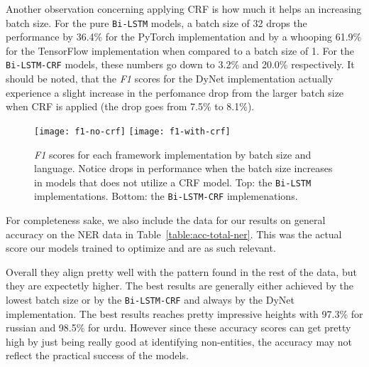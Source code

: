 Another observation concerning applying CRF is how much it helps an increasing
batch size. For the pure \texttt{Bi-LSTM} models, a batch size of 32 drops the
performance by 36.4\% for the PyTorch implementation and by a whooping 61.9\%
for the TensorFlow implementation when compared to a batch size of 1. For the
\texttt{Bi-LSTM-CRF} models, these numbers go down to 3.2\% and 20.0\%
respectively. It should be noted, that the \textit{F1} scores for the DyNet
implementation actually experience a slight increase in the perfomance drop from
the larger batch size when CRF is applied (the drop goes from 7.5\% to 8.1\%).

\begin{figure}[h!]
    \texttt{[image: f1-no-crf]}
    \texttt{[image: f1-with-crf]}
    \caption{\textit{F1} scores for each framework implementation by batch size
        and language. Notice drops in performance when the batch size increases
        in models that does not utilize a CRF model. Top: the \texttt{Bi-LSTM}
        implementations. Bottom: the \texttt{Bi-LSTM-CRF} implemenations.
    }\label{chart:f1-by-batch-and-lang}
\end{figure}

For completeness sake, we also include the data for our results on general
accuracy on the NER data in Table~\ref{table:acc-total-ner}. This was the actual
score our models trained to optimize and are as such relevant. 

Overall they align pretty well with the pattern found in the rest of the data,
but they are expectetly higher. The best results are generally either achieved
by the lowest batch size or by the \texttt{Bi-LSTM-CRF} and always by the DyNet
implementation. The best results reaches pretty impressive heights with
97.3\% for russian and 98.5\% for urdu. However since these accuracy scores can
get pretty high by just being really good at identifying non-entities, the
accuracy may not reflect the practical success of the models.

